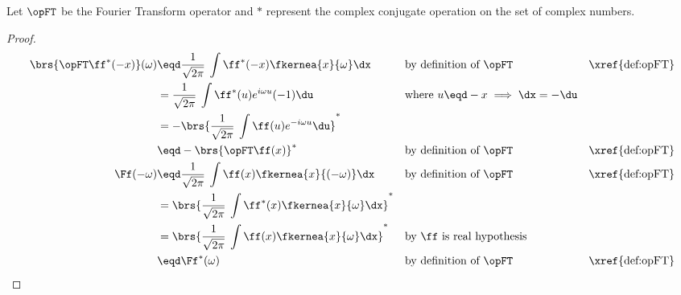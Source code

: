 \begin{theorem}
\label{thm:ft_conj}
\label{thm:ft_neg}
Let $\opFT$ be the Fourier Transform operator and $\ast$ represent the complex conjugate operation on the set of
complex numbers.
\end{theorem}
\begin{proof}
\begin{align*}
  \brs{\opFT\ff^\ast(-x)}(\omega)
     &\eqd \frac{1}{\sqrt{2\pi}}\:\int \ff^\ast(-x) \fkernea{x}{\omega}\dx
     &&    \text{by definition of $\opFT$}
     &&    \text{\xref{def:opFT}}
   \\&=    \frac{1}{\sqrt{2\pi}}\:\int \ff^\ast(u) e^{i\omega u}(-1)\du
     &&    \text{where $u\eqd-x\implies\dx=-\du$}
   \\&=    -\brs{\frac{1}{\sqrt{2\pi}}\:\int \ff(u) e^{-i\omega u}\du}^\ast
   \\&\eqd -\brs{\opFT\ff(x)}^\ast
     &&    \text{by definition of $\opFT$}
     &&    \text{\xref{def:opFT}}
   \\
   \Ff(-\omega)
     &\eqd \frac{1}{\sqrt{2\pi}}\:\int \ff(x) \fkernea{x}{(-\omega)}\dx
     &&    \text{by definition of $\opFT$}
     &&    \text{\xref{def:opFT}}
   \\&=    \brs{\frac{1}{\sqrt{2\pi}}\:\int \ff^\ast(x) \fkernea{x}{\omega}\dx}^\ast
   \\&=    \brs{\frac{1}{\sqrt{2\pi}}\:\int \ff     (x) \fkernea{x}{\omega}\dx}^\ast
     &&    \text{by $\ff$ is real hypothesis}
   \\&\eqd \Ff^\ast(\omega)
     &&    \text{by definition of $\opFT$}
     &&    \text{\xref{def:opFT}}
\end{align*}
\end{proof}



